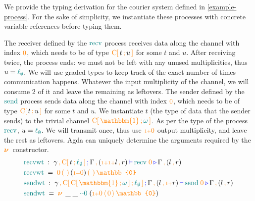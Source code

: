 \documentclass[runningheads]{llncs}
\newcommand{\type}[1]{\textcolor{blue}{\operatorname{#1}}}
\newcommand{\constr}[1]{\textcolor{orange}{\operatorname{#1}}}
\newcommand{\func}[1]{\textcolor{teal}{\operatorname{#1}}}
\newcommand{\PO}{\constr{\mathbb{0}}}
\newcommand{\new}{\constr{\boldsymbol{\nu}} \,}
\newcommand{\send}[2]{#1 \, \constr{\langle} \, #2 \,\constr{\rangle} \,}
\newcommand{\recv}[2]{#1 \, \constr{\mathbb{(}} \, #2 \, \constr{\mathbb{)}} \,}
\newcommand{\suc}{\constr{\scriptstyle 1+}}
\newcommand{\unit}{\constr{\mathbbm{1}}}
\newcommand{\channel}[2]{\constr{C[} \, #1 \, \constr{;} \, #2 \, \constr{]}}
\newcommand{\comma}{\, \constr{,} \,}
\newcommand{\zero}{\func{\cdot-0}}
\newcommand{\lz}{\func{\ell_{\emptyset}}}
\newcommand{\types}[4]{#1 \, \type{;} \, #2 \, \type{\vdash} \, #3 \, \type{\triangleright} \, #4}
\begin{document}
\begin{example}
\label{example-derivation}
We provide the typing derivation for the courier system defined in \autoref{example-process}.
For the sake of simplicity, we instantiate these processes with concrete variable references before typing them.

The receiver defined by the $\func{recv}$ process receives data along the channel with index $\constr{0}$, which needs to be of type $\channel{t}{u}$ for some $t$ and $u$.
After receiving twice, the process ends: we must not be left with any unused multiplicities, thus $u = \lz$.
We will use graded types to keep track of the exact number of times communication happens.
Whatever the input multiplicity of the channel, we will consume $2$ of it and leave the remaining as leftovers.
The sender defined by the $\func{send}$ process sends data along the channel with index $\constr{0}$, which needs to be of type $\channel{t}{u}$ for some $t$ and $u$.
We instantiate $t$ (the type of data that the sender sends) to the trivial channel $\channel{\unit}{\func{\omega}}$.
As per the type of the process $\func{recv}$, $u = \lz$.
We will transmit once, thus use $\suc{\constr{0}}$ output multiplicity, and leave the rest as leftovers.
Agda can uniquely determine the arguments required by the $\new{}$ constructor.
\begin{align*}
   & \func{recvwt} \;  : \; \types{\gamma \comma \channel{t}{\lz}  }{\Gamma \comma (\suc \suc l \comma r)  }{\func{recv} \; \constr{0}  }{\Gamma \comma (l \comma r)} \\
   & \func{recvwt} \;  = \; \recv{\constr{0}}{} \recv{(\suc \constr{0})}{} \PO \\
   & \func{sendwt} \;  : \; \types{\gamma \comma \channel{\channel{\unit}{\func{\omega}}}{\lz}  }{\Gamma \comma (l \comma \suc r)  }{\func{send} \; \constr{0}  }{\Gamma \comma (l \comma r)}  \\
   & \func{sendwt} \;  = \; \new{} \; \_ \; \_ \; \zero \; (\send{\suc \constr{0}}{\constr{0}} \PO)
\end{align*}


\end{example}
\end{document}
